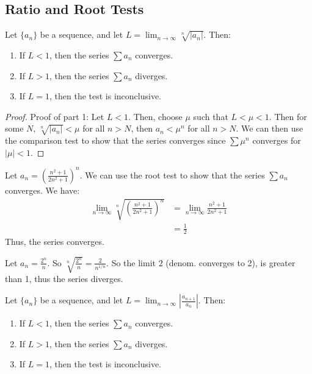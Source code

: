 \documentclass[11pt]{article}
\begin{document}
\subsection{Ratio and Root Tests}
\begin{theorem}
    Let $\{a_n\}$ be a sequence, and let $L = \lim_{n \to \infty} \sqrt[n]{|a_n|}$. Then:
    \begin{enumerate}
        \item If $L < 1$, then the series $\sum a_n$ converges.
        \item If $L > 1$, then the series $\sum a_n$ diverges.
        \item If $L = 1$, then the test is inconclusive.
    \end{enumerate}
\end{theorem}
\begin{proof}
    Proof of part 1: Let $L < 1$. Then, choose $\mu$ such that $L < \mu < 1$. Then for some $N$, $\sqrt[n]{|a_n|} < \mu$ for all $n > N$, then $a_n < \mu^n$ for all $n > N$. We can then use the comparison test to show that the series converges since $\sum \mu^n$ converges for $|\mu| < 1$.
\end{proof}
\begin{example}
    Let $a_n = \left ( \frac{n^2 + 1}{2n^2 + 1} \right )^n$. We can use the root test to show that the series $\sum a_n$ converges. We have:
    \begin{align*}
        \lim_{n \to \infty} \sqrt[n]{\left ( \frac{n^2 + 1}{2n^2 + 1} \right )^n} &= \lim_{n \to \infty} \frac{n^2 + 1}{2n^2 + 1} \\
        &= \frac{1}{2}
    \end{align*}
    Thus, the series converges.
\end{example}
\begin{example}
    Let $a_n = \frac{2^n}{n}$. So $\sqrt[n]{\frac{2^n}{n}} = \frac{2}{n^{1/n}}$. So the limit $2$ (denom. converges to 2), is greater than 1, thus the series diverges.
\end{example}
\begin{theorem}
    Let $\{a_n\}$ be a sequence, and let $L = \lim_{n \to \infty} \left | \frac{a_{n+1}}{a_n} \right |$. Then:
    \begin{enumerate}
        \item If $L < 1$, then the series $\sum a_n$ converges.
        \item If $L > 1$, then the series $\sum a_n$ diverges.
        \item If $L = 1$, then the test is inconclusive.
    \end{enumerate}
\end{theorem}
\end{document}
